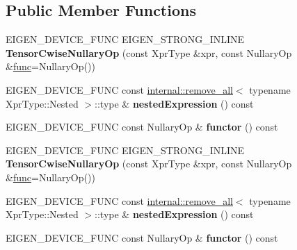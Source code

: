 \subsection*{Public Member Functions}
\begin{DoxyCompactItemize}
\item 
\mbox{\label{class_eigen_1_1_tensor_cwise_nullary_op_a07e12be91a4e94184a91ebc52e134fec}} 
E\+I\+G\+E\+N\+\_\+\+D\+E\+V\+I\+C\+E\+\_\+\+F\+U\+NC E\+I\+G\+E\+N\+\_\+\+S\+T\+R\+O\+N\+G\+\_\+\+I\+N\+L\+I\+NE {\bfseries Tensor\+Cwise\+Nullary\+Op} (const Xpr\+Type \&xpr, const Nullary\+Op \&\hyperlink{structfunc}{func}=Nullary\+Op())
\item 
\mbox{\label{class_eigen_1_1_tensor_cwise_nullary_op_a1681a2544222f495a4c9365565e2f92e}} 
E\+I\+G\+E\+N\+\_\+\+D\+E\+V\+I\+C\+E\+\_\+\+F\+U\+NC const \hyperlink{struct_eigen_1_1internal_1_1remove__all}{internal\+::remove\+\_\+all}$<$ typename Xpr\+Type\+::\+Nested $>$\+::type \& {\bfseries nested\+Expression} () const
\item 
\mbox{\label{class_eigen_1_1_tensor_cwise_nullary_op_a9a47dbcb84a314d0a9d6c552229f91a3}} 
E\+I\+G\+E\+N\+\_\+\+D\+E\+V\+I\+C\+E\+\_\+\+F\+U\+NC const Nullary\+Op \& {\bfseries functor} () const
\item 
\mbox{\label{class_eigen_1_1_tensor_cwise_nullary_op_a07e12be91a4e94184a91ebc52e134fec}} 
E\+I\+G\+E\+N\+\_\+\+D\+E\+V\+I\+C\+E\+\_\+\+F\+U\+NC E\+I\+G\+E\+N\+\_\+\+S\+T\+R\+O\+N\+G\+\_\+\+I\+N\+L\+I\+NE {\bfseries Tensor\+Cwise\+Nullary\+Op} (const Xpr\+Type \&xpr, const Nullary\+Op \&\hyperlink{structfunc}{func}=Nullary\+Op())
\item 
\mbox{\label{class_eigen_1_1_tensor_cwise_nullary_op_a1681a2544222f495a4c9365565e2f92e}} 
E\+I\+G\+E\+N\+\_\+\+D\+E\+V\+I\+C\+E\+\_\+\+F\+U\+NC const \hyperlink{struct_eigen_1_1internal_1_1remove__all}{internal\+::remove\+\_\+all}$<$ typename Xpr\+Type\+::\+Nested $>$\+::type \& {\bfseries nested\+Expression} () const
\item 
\mbox{\label{class_eigen_1_1_tensor_cwise_nullary_op_a9a47dbcb84a314d0a9d6c552229f91a3}} 
E\+I\+G\+E\+N\+\_\+\+D\+E\+V\+I\+C\+E\+\_\+\+F\+U\+NC const Nullary\+Op \& {\bfseries functor} () const
\end{DoxyCompactItemize}
